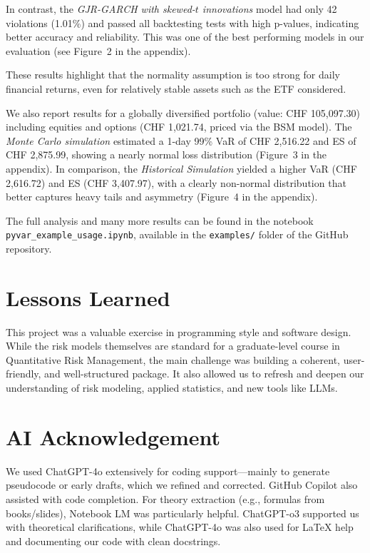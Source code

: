 \documentclass{article}
\begin{document}
In contrast, the \textit{GJR-GARCH with skewed-$t$ innovations} model had only 42 violations (1.01\%) and passed all backtesting tests with high p-values, indicating better accuracy and reliability. This was one of the best performing models in our evaluation (see Figure 2 in the appendix).

These results highlight that the normality assumption is too strong for daily financial returns, even for relatively stable assets such as the ETF considered.

We also report results for a globally diversified portfolio (value: CHF 105{,}097.30) including equities and options (CHF 1{,}021.74, priced via the BSM model). The \textit{Monte Carlo simulation} estimated a 1-day 99\% VaR of CHF 2{,}516.22 and ES of CHF 2{,}875.99, showing a nearly normal loss distribution (Figure 3 in the appendix). In comparison, the \textit{Historical Simulation} yielded a higher VaR (CHF 2{,}616.72) and ES (CHF 3{,}407.97), with a clearly non-normal distribution that better captures heavy tails and asymmetry (Figure 4 in the appendix).

The full analysis and many more results can be found in the notebook \texttt{pyvar\_example\_usage.ipynb}, available in the \texttt{examples/} folder of the GitHub repository.


\section{Lessons Learned}

This project was a valuable exercise in programming style and software design. While the risk models themselves are standard for a graduate-level course in Quantitative Risk Management, the main challenge was building a coherent, user-friendly, and well-structured package. It also allowed us to refresh and deepen our understanding of risk modeling, applied statistics, and new tools like LLMs.


\section{AI Acknowledgement}

We used ChatGPT-4o extensively for coding support—mainly to generate pseudocode or early drafts, which we refined and corrected. GitHub Copilot also assisted with code completion. For theory extraction (e.g., formulas from books/slides), Notebook LM was particularly helpful.  
ChatGPT-o3 supported us with theoretical clarifications, while ChatGPT-4o was also used for LaTeX help and documenting our code with clean docstrings.
\end{document}
